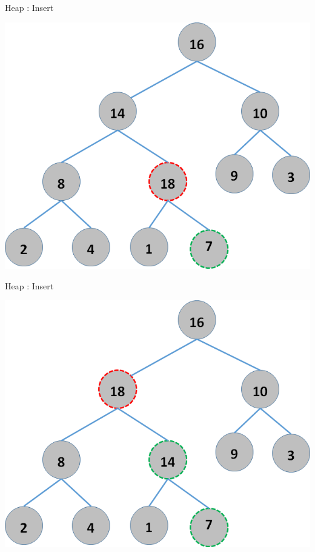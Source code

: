 \documentclass{beamer}
\begin{document}
\begin{frame}{Heap : Insert}
    \begin{center}
        \includegraphics[scale=0.5]{heapInsert3.png}
    \end{center}
\end{frame}


\begin{frame}{Heap : Insert}
    \begin{center}
        \includegraphics[scale=0.5]{heapInsert4.png}
    \end{center}
\end{frame}
\end{document}
